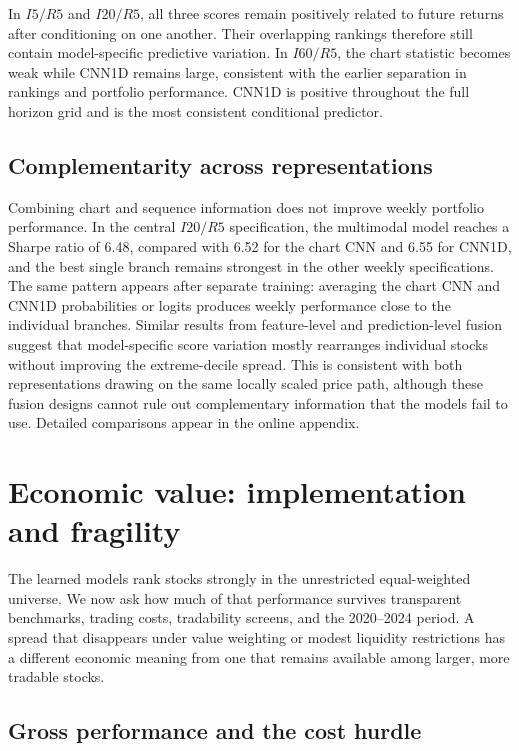 In $I5/R5$ and $I20/R5$, all three scores remain positively related to future returns after conditioning on one another. Their overlapping rankings therefore still contain model-specific predictive variation. In $I60/R5$, the chart statistic becomes weak while CNN1D remains large, consistent with the earlier separation in rankings and portfolio performance. CNN1D is positive throughout the full horizon grid and is the most consistent conditional predictor.

\FloatBarrier

\subsection{Complementarity across representations}\label{subsec:fusion_results}

Combining chart and sequence information does not improve weekly portfolio performance. In the central $I20/R5$ specification, the multimodal model reaches a Sharpe ratio of 6.48, compared with 6.52 for the chart CNN and 6.55 for CNN1D, and the best single branch remains strongest in the other weekly specifications. The same pattern appears after separate training: averaging the chart CNN and CNN1D probabilities or logits produces weekly performance close to the individual branches. Similar results from feature-level and prediction-level fusion suggest that model-specific score variation mostly rearranges individual stocks without improving the extreme-decile spread. This is consistent with both representations drawing on the same locally scaled price path, although these fusion designs cannot rule out complementary information that the models fail to use. Detailed comparisons appear in the online appendix.

\section{Economic value: implementation and fragility}\label{sec:economic_limits}

The learned models rank stocks strongly in the unrestricted equal-weighted universe. We now ask how much of that performance survives transparent benchmarks, trading costs, tradability screens, and the 2020--2024 period. A spread that disappears under value weighting or modest liquidity restrictions has a different economic meaning from one that remains available among larger, more tradable stocks.

\subsection{Gross performance and the cost hurdle}\label{subsec:benchmark_results}

